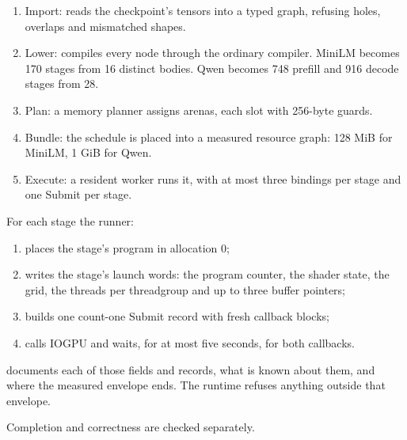 \begin{enumerate}
\def\labelenumi{\arabic{enumi}.}
\item Import:  reads the checkpoint's tensors into a typed graph, refusing holes,
  overlaps and mismatched shapes.
\item Lower:  compiles every node through the ordinary compiler. MiniLM becomes 170
  stages from 16 distinct bodies. Qwen becomes 748 prefill and 916 decode stages from 28.
\item Plan: a memory planner assigns arenas, each slot with 256-byte guards.
\item Bundle: the schedule is placed into a measured resource graph: 128 MiB for MiniLM, 1 GiB for Qwen.
\item Execute: a resident worker runs it, with at most three bindings per stage and one Submit per stage.
\end{enumerate}

For each stage the runner:

\begin{enumerate}
\def\labelenumi{\arabic{enumi}.}
\item places the stage's program in allocation 0;
\item writes the stage's launch words: the program counter, the shader state, the grid, the threads per threadgroup and
  up to three buffer pointers;
\item builds one count-one Submit record with fresh callback blocks;
\item calls IOGPU and waits, for at most five seconds, for both callbacks.
\end{enumerate}

 documents each of those fields and records, what is known about them, and where the measured envelope
ends. The runtime refuses anything outside that envelope.

Completion and correctness are checked separately.

